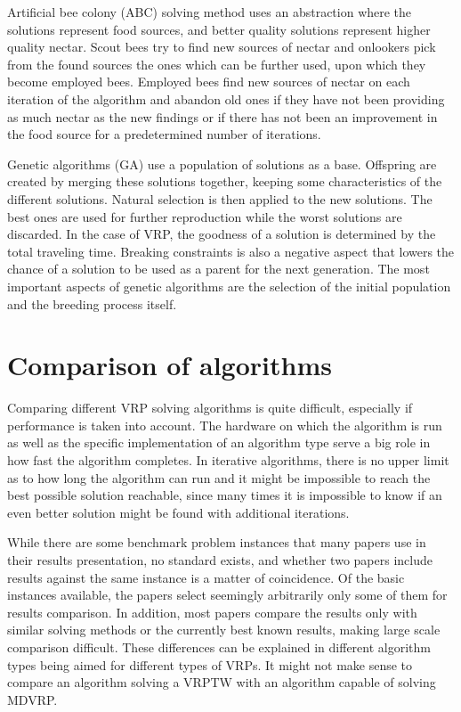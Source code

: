 Artificial bee colony (ABC) solving method uses an abstraction where the solutions represent food sources, and better quality solutions represent higher quality nectar. Scout bees try to find new sources of nectar and onlookers pick from the found sources the ones which can be further used, upon which they become employed bees. Employed bees find new sources of nectar on each iteration of the algorithm and abandon old ones if they have not been providing as much nectar as the new findings or if there has not been an improvement in the food source for a predetermined number of iterations. \cite{szeto2011artificial}

Genetic algorithms (GA) use a population of solutions as a base. Offspring are created by merging these solutions together, keeping some characteristics of the different solutions. Natural selection is then applied to the new solutions. The best ones are used for further reproduction while the worst solutions are discarded. In the case of VRP, the goodness of a solution is determined by the total traveling time. Breaking constraints is also a negative aspect that lowers the chance of a solution to be used as a parent for the next generation. The most important aspects of genetic algorithms are the selection of the initial population and the breeding process itself. \cite{baker2003genetic}


\section{Comparison of algorithms}

Comparing different VRP solving algorithms is quite difficult, especially if performance is taken into account. The hardware on which the algorithm is run as well as the specific implementation of an algorithm type serve a big role in how fast the algorithm completes. In iterative algorithms, there is no upper limit as to how long the algorithm can run and it might be impossible to reach the best possible solution reachable, since many times it is impossible to know if an even better solution might be found with additional iterations. 

While there are some benchmark problem instances that many papers use in their results presentation, no standard exists, and whether two papers include results against the same instance is a matter of coincidence. Of the basic instances available, the papers select seemingly arbitrarily only some of them for results comparison. In addition, most papers compare the results only with similar solving methods or the currently best known results, making large scale comparison difficult. These differences can be explained in different algorithm types being aimed for different types of VRPs. It might not make sense to compare an algorithm solving a VRPTW with an algorithm capable of solving MDVRP.







